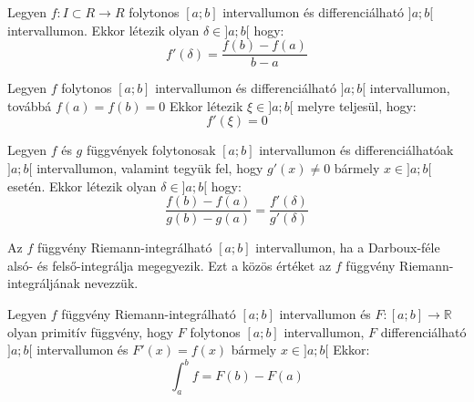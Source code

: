 \documentclass[11pt,a4paper]{article}
\begin{document}
\begin{tcolorbox}[colback=green!5!white,colframe=green!60!black,title= 1. Lagrange középérték tétel]
    Legyen \(f : I \subset R \to R\) folytonos \([a; b]\) intervallumon és differenciálható \(]a; b[\) intervallumon. Ekkor
létezik olyan \(\delta \in ]a; b[\) hogy:
$$f'(\delta) = \frac{f(b)-f(a)}{b-a}$$
\end{tcolorbox}

\begin{tcolorbox}[colback=green!5!white,colframe=green!60!black,title= 2. Rolle középérték tétel]
    Legyen \(f\) folytonos \([a; b]\) intervallumon és differenciálható \(]a; b[\) intervallumon, továbbá \(f(a) = f(b) = 0\)
Ekkor létezik \( \xi \in ]a; b[\) melyre teljesül, hogy:
$$f'(\xi) = 0$$
\end{tcolorbox}

\begin{tcolorbox}[colback=green!5!white,colframe=green!60!black,title= 3. Cauchy középérték tétel]
    Legyen \(f\) és \(g\) függvények folytonosak \([a; b]\) intervallumon és differenciálhatóak \(]a; b[\) intervallumon,
valamint tegyük fel, hogy \(g'(x) \neq 0\) bármely \(x \in ]a; b[\) esetén. Ekkor létezik olyan \(\delta \in]a; b[\) hogy:
$$\frac{f(b)-f(a)}{g(b)-g(a)} = \frac{f'(\delta)}{g'(\delta)}$$
\end{tcolorbox}

\begin{tcolorbox}[colback=green!5!white,colframe=green!60!black,title= 4. Riemann-Integrálhatóság]
    Az \(f\) függvény Riemann-integrálható \([a; b]\) intervallumon, ha a Darboux-féle alsó- és felső-integrálja
megegyezik. Ezt a közös értéket az \(f\) függvény Riemann-integráljának nevezzük.
\end{tcolorbox}

\begin{tcolorbox}[colback=green!5!white,colframe=green!60!black,title= 5. Newton-Leibniz formula]
    Legyen \(f\) függvény Riemann-integrálható \([a; b]\) intervallumon és \(F : [a; b] \to \mathbb{R} \) olyan primitív függvény,
hogy \(F\) folytonos \([a; b]\) intervallumon, \(F\) differenciálható \(]a; b[\) intervallumon és \(F'(x) = f(x)\) bármely
\(x \in ]a; b[\) Ekkor:
$$\int_{a}^{b} f = F(b)-F(a) $$
\end{tcolorbox}
\end{document}
